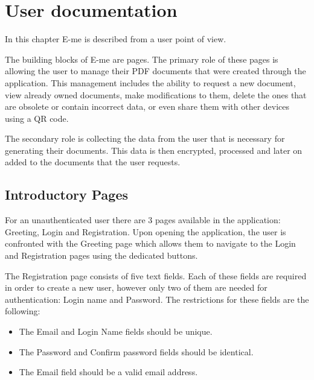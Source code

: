 \chapter{User documentation}\label{ch:BASIC}

\begin{summary}
	In this chapter E-me is described from a user point of view.
\end{summary}

The building blocks of E-me are pages.
The primary role of these pages is allowing the user to manage their PDF documents that were created through the application.
This management includes the ability to request a new document, view already owned documents, make modifications to them, delete the ones that are
obsolete or contain incorrect data, or even share them with other devices using a QR code.

The secondary role is collecting the data from the user that is necessary for generating their documents. 
This data is then encrypted, processed and later on added to the documents that the user requests. 

	\section{Introductory Pages}

		For an unauthenticated user there are 3 pages available in the application: Greeting, Login and Registration.
		Upon opening the application, the user is confronted with the Greeting page which allows them to navigate to the Login and Registration pages using the dedicated buttons.

		The Registration page consists of five text fields.
		Each of these fields are required in order to create a new user, however only two of them are needed for authentication: Login name and Password.
		The restrictions for these fields are the following:
		\begin{itemize}
			\item The Email and Login Name fields should be unique.
			\item The Password and Confirm password fields should be identical.
			\item The Email field should be a valid email address.
		\end{itemize}
		
